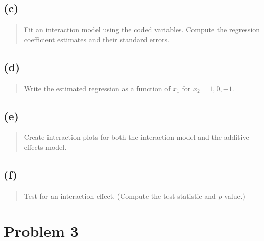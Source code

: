 \documentclass[
]{article}
\begin{document}
\hypertarget{c-1}{%
\subsection{(c)}\label{c-1}}

\begin{quote}
Fit an interaction model using the coded variables. Compute the
regression coefficient estimates and their standard errors.
\end{quote}

\vspace{50pt}

\hypertarget{d-1}{%
\subsection{(d)}\label{d-1}}

\begin{quote}
Write the estimated regression as a function of \(x_1\) for
\(x_2 = 1,0,-1\).
\end{quote}

\vspace{50pt}

\hypertarget{e-1}{%
\subsection{(e)}\label{e-1}}

\begin{quote}
Create interaction plots for both the interaction model and the additive
effects model.
\end{quote}

\vspace{50pt}

\hypertarget{f-1}{%
\subsection{(f)}\label{f-1}}

\begin{quote}
Test for an interaction effect. (Compute the test statistic and
\(p\)-value.)
\end{quote}

\vspace{50pt}

\hypertarget{problem-3}{%
\section{Problem 3}\label{problem-3}}
\end{document}
